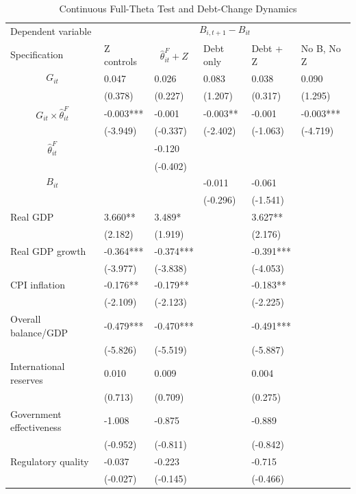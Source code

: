 \begin{table}[H]\centering
\begin{threeparttable}
\caption{Continuous Full-Theta Test and Debt-Change Dynamics}
\label{tab:continuous_fulltheta_debt}
\scriptsize
\begin{tabularx}{\textwidth}{lYYYYY}
\toprule
Dependent variable &  \\
\cmidrule(lr){2-6}
Specification & Z controls & $$\widehat{\theta}^{F}_{it}+Z$$ & Debt only & Debt + Z & No B, No Z \\
\midrule
$$G_{it}$$ & 0.047 & 0.026 & 0.083 & 0.038 & 0.090 \\
  & (0.378) & (0.227) & (1.207) & (0.317) & (1.295) \\
$$G_{it}\times\widehat{\theta}^{F}_{it}$$ & -0.003*** & -0.001 & -0.003** & -0.001 & -0.003*** \\
  & (-3.949) & (-0.337) & (-2.402) & (-1.063) & (-4.719) \\
$$\widehat{\theta}^{F}_{it}$$ &  & -0.120 &  &  &  \\
  &  & (-0.402) &  &  &  \\
$$B_{it}$$ &  &  & -0.011 & -0.061 &  \\
  &  &  & (-0.296) & (-1.541) &  \\
Real GDP & 3.660** & 3.489* &  & 3.627** &  \\
  & (2.182) & (1.919) &  & (2.176) &  \\
Real GDP growth & -0.364*** & -0.374*** &  & -0.391*** &  \\
  & (-3.977) & (-3.838) &  & (-4.053) &  \\
CPI inflation & -0.176** & -0.179** &  & -0.183** &  \\
  & (-2.109) & (-2.123) &  & (-2.225) &  \\
Overall balance/GDP & -0.479*** & -0.470*** &  & -0.491*** &  \\
  & (-5.826) & (-5.519) &  & (-5.887) &  \\
International reserves & 0.010 & 0.009 &  & 0.004 &  \\
  & (0.713) & (0.709) &  & (0.275) &  \\
Government effectiveness & -1.008 & -0.875 &  & -0.889 &  \\
  & (-0.952) & (-0.811) &  & (-0.842) &  \\
Regulatory quality & -0.037 & -0.223 &  & -0.715 &  \\
  & (-0.027) & (-0.145) &  & (-0.466) &  \\

\end{tabularx}
\end{threeparttable}
\end{table}

